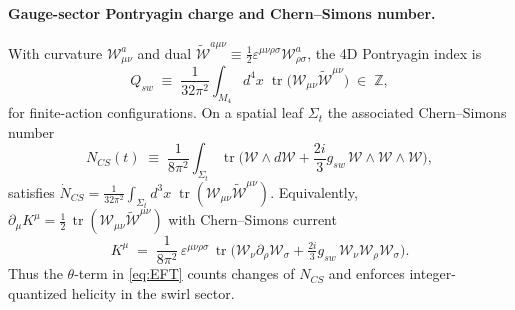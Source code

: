 \documentclass[11pt, preprint,titlepage]{revtex4-2}
\begin{document}
	\paragraph{Gauge-sector Pontryagin charge and Chern--Simons number.}
	With curvature \(\mathcal{W}_{\mu\nu}^a\) and dual \(\tilde{\mathcal{W}}^{a\mu\nu} \equiv \tfrac12 \varepsilon^{\mu\nu\rho\sigma}\mathcal{W}^a_{\rho\sigma}\),
	the 4D Pontryagin index is
	\begin{equation}
		Q_{\!sw} \;\equiv\; \frac{1}{32\pi^2} \int_{M_4} \! d^4x\; \mathop{\mathrm{tr}}\!\big(\mathcal{W}_{\mu\nu}\tilde{\mathcal{W}}^{\mu\nu}\big) \;\in\; \mathbb{Z},
		\label{eq:Qsw}
	\end{equation}
	for finite-action configurations. On a spatial leaf \(\Sigma_t\) the associated Chern--Simons number
	\begin{equation}
		N_{\!CS}(t) \;\equiv\; \frac{1}{8\pi^2} \int_{\Sigma_t} \mathop{\mathrm{tr}}\!\Big(\mathcal{W}\wedge d\mathcal{W} + \frac{2i}{3} g_{\!sw}\,\mathcal{W}\wedge\mathcal{W}\wedge\mathcal{W}\Big),
	\end{equation}
	satisfies \(\dot N_{\!CS}=\tfrac{1}{32\pi^2}\!\int_{\Sigma_t}\! d^3x\;\mathop{\mathrm{tr}}(\mathcal{W}_{\mu\nu}\tilde{\mathcal{W}}^{\mu\nu})\).
	Equivalently,
	\(\partial_\mu K^\mu=\tfrac12\,\mathop{\mathrm{tr}}(\mathcal{W}_{\mu\nu}\tilde{\mathcal{W}}^{\mu\nu})\)
	with Chern--Simons current
	\begin{equation}
		K^\mu \;=\; \frac{1}{8\pi^2}\,\varepsilon^{\mu\nu\rho\sigma}\,\mathop{\mathrm{tr}}\!\Big(\mathcal{W}_\nu\partial_\rho\mathcal{W}_\sigma + \tfrac{2i}{3} g_{\!sw}\,\mathcal{W}_\nu\mathcal{W}_\rho\mathcal{W}_\sigma\Big).
	\end{equation}
	Thus the \(\theta\)-term in \eqref{eq:EFT} counts changes of \(N_{\!CS}\) and enforces integer-quantized helicity in the swirl sector.
\end{document}
